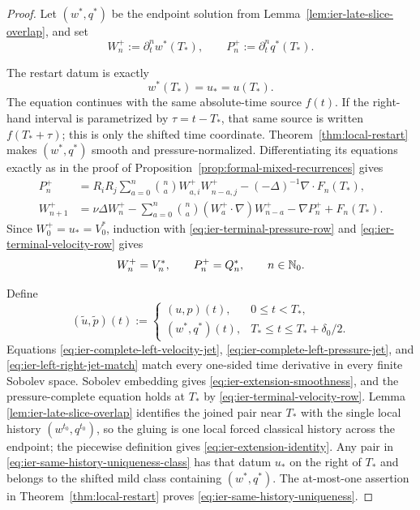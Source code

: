 \begin{proof}
Let \((w^*,q^*)\) be the endpoint solution from
Lemma~\ref{lem:ier-late-slice-overlap}, and set
\[
 W_n^+:=\partial_t^nw^*(T_*),
 \qquad
 P_n^+:=\partial_t^nq^*(T_*).
\]
\begin{samepage}
The restart datum is exactly
\[
 w^*(T_*)=u_*=u(T_*).
\]
The equation continues with the same absolute-time source \(f(t)\).  If the
right-hand interval is parametrized by \(\tau=t-T_*\), that same source is
written \(f(T_*+\tau)\); this is only the shifted time coordinate.
Theorem~\ref{thm:local-restart} makes \((w^*,q^*)\) smooth and
pressure-normalized.  Differentiating its equations exactly as in the proof of
Proposition~\ref{prop:formal-mixed-recurrences} gives
\begin{align*}
 P_n^+&=R_iR_j\sum_{a=0}^{n}\binom naW_{a,i}^+W_{n-a,j}^+
 -(-\Delta)^{-1}\nabla\cdot F_n(T_*),\\
 W_{n+1}^+&=\nu\Delta W_n^+
 -\sum_{a=0}^{n}\binom na(W_a^+\cdot\nabla)W_{n-a}^+
 -\nabla P_n^++F_n(T_*).
\end{align*}
Since \(W_0^+=u_*=V_0^*\), induction with
\eqref{eq:ier-terminal-pressure-row} and
\eqref{eq:ier-terminal-velocity-row} gives
\begin{equation}
 W_n^+=V_n^*,
 \qquad P_n^+=Q_n^*,
 \qquad n\in\mathbb N_0.
 \label{eq:ier-left-right-jet-match}
\end{equation}
\par
\end{samepage}

Define
\[
 (\widetilde u,\widetilde p)(t)
 :=\begin{cases}
 (u,p)(t),&0\le t<T_*,\\
 (w^*,q^*)(t),&T_*\le t\le T_*+\delta_0/2.
 \end{cases}
\]
Equations \eqref{eq:ier-complete-left-velocity-jet},
\eqref{eq:ier-complete-left-pressure-jet}, and
\eqref{eq:ier-left-right-jet-match} match every one-sided time derivative in
every finite Sobolev space.  Sobolev embedding gives
\eqref{eq:ier-extension-smoothness}, and the pressure-complete equation holds
at \(T_*\) by \eqref{eq:ier-terminal-velocity-row}.  Lemma
\ref{lem:ier-late-slice-overlap} identifies the joined pair near \(T_*\) with
the single local history \((w^{t_0},q^{t_0})\), so the gluing is one local
forced classical history across the endpoint; the piecewise definition gives
\eqref{eq:ier-extension-identity}.  Any pair in
\eqref{eq:ier-same-history-uniqueness-class} has that datum \(u_*\) on
the right of \(T_*\) and belongs to the shifted mild class containing
\((w^*,q^*)\).  The at-most-one assertion in
Theorem~\ref{thm:local-restart} proves
\eqref{eq:ier-same-history-uniqueness}.
\end{proof}

